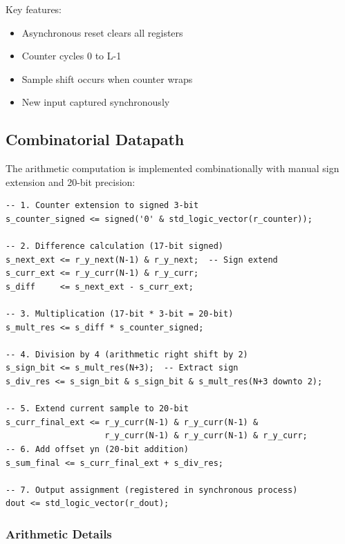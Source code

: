 \documentclass[a4paper,11pt]{article}
\begin{document}
Key features:
\begin{itemize}
    \item Asynchronous reset clears all registers
    \item Counter cycles 0 to L-1 
    \item Sample shift occurs when counter wraps
    \item New input captured synchronously
\end{itemize}

\subsection{Combinatorial Datapath}

The arithmetic computation is implemented combinationally with manual sign extension and 20-bit precision:

\begin{lstlisting}
-- 1. Counter extension to signed 3-bit
s_counter_signed <= signed('0' & std_logic_vector(r_counter));

-- 2. Difference calculation (17-bit signed)
s_next_ext <= r_y_next(N-1) & r_y_next;  -- Sign extend
s_curr_ext <= r_y_curr(N-1) & r_y_curr;
s_diff     <= s_next_ext - s_curr_ext;

-- 3. Multiplication (17-bit * 3-bit = 20-bit)
s_mult_res <= s_diff * s_counter_signed;

-- 4. Division by 4 (arithmetic right shift by 2)
s_sign_bit <= s_mult_res(N+3);  -- Extract sign
s_div_res <= s_sign_bit & s_sign_bit & s_mult_res(N+3 downto 2);

-- 5. Extend current sample to 20-bit
s_curr_final_ext <= r_y_curr(N-1) & r_y_curr(N-1) & 
                    r_y_curr(N-1) & r_y_curr(N-1) & r_y_curr;
-- 6. Add offset yn (20-bit addition)                    
s_sum_final <= s_curr_final_ext + s_div_res;

-- 7. Output assignment (registered in synchronous process)
dout <= std_logic_vector(r_dout);
\end{lstlisting}

\subsubsection{Arithmetic Details}
\end{document}
